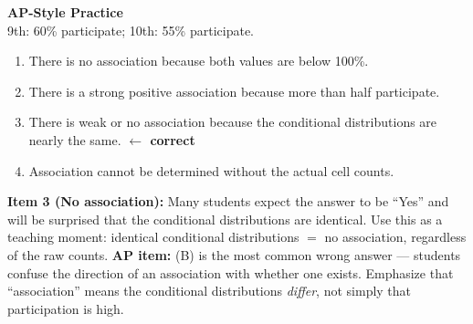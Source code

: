 \documentclass[10pt]{article}
\begin{document}
\vspace{0.2in}

\begin{tcolorbox}[colback=redbg, colframe=redacc, boxrule=0.8pt, arc=2mm,
    left=4mm, right=4mm, top=3mm, bottom=3mm]
\small\textbf{AP-Style Practice}\\[6pt]
9th: 60\% participate; 10th: 55\% participate.

\begin{enumerate}[label=\textbf{(\Alph*)}, leftmargin=2em, itemsep=6pt]
  \item There is no association because both values are below 100\%.
  \item There is a strong positive association because more than half participate.
  \item There is weak or no association because the conditional distributions are nearly the same.
        \textcolor{keyred}{\textbf{$\leftarrow$ correct}}
  \item Association cannot be determined without the actual cell counts.
\end{enumerate}

\vspace{6pt}
\end{tcolorbox}

\begin{teachernote}
\textbf{Item 3 (No association):} Many students expect the answer to be ``Yes'' and will be
surprised that the conditional distributions are identical. Use this as a teaching moment:
identical conditional distributions $=$ no association, regardless of the raw counts.
\textbf{AP item:} (B) is the most common wrong answer --- students confuse the direction of
an association with whether one exists. Emphasize that ``association'' means the conditional
distributions \emph{differ}, not simply that participation is high.
\end{teachernote}
\end{document}
